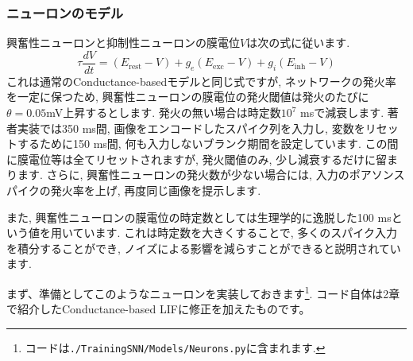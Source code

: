 \subsubsection{ニューロンのモデル}
興奮性ニューロンと抑制性ニューロンの膜電位$V$は次の式に従います. 
\begin{equation}
\tau \frac{d V}{d t}=\left(E_{\text {rest}}-V\right)+g_{e}\left(E_{\text {exc}}-V\right)+g_{i}\left(E_{\text {inh}}-V\right)    
\end{equation}
これは通常のConductance-basedモデルと同じ式ですが, ネットワークの発火率を一定に保つため, 興奮性ニューロンの膜電位の発火閾値は発火のたびに$\theta=0.05 $mV上昇するとします. 発火の無い場合は時定数$10^7$ msで減衰します. 著者実装では350 ms間, 画像をエンコードしたスパイク列を入力し, 変数をリセットするために150 ms間, 何も入力しないブランク期間を設定しています. この間に膜電位等は全てリセットされますが, 発火閾値のみ, 少し減衰するだけに留まります. さらに, 興奮性ニューロンの発火数が少ない場合には, 入力のポアソンスパイクの発火率を上げ, 再度同じ画像を提示します. \par
また, 興奮性ニューロンの膜電位の時定数としては生理学的に逸脱した100 msという値を用いています. これは時定数を大きくすることで, 多くのスパイク入力を積分することができ, ノイズによる影響を減らすことができると説明されています. \par
まず、準備としてこのようなニューロンを実装しておきます\footnote{コードは\texttt{./TrainingSNN/Models/Neurons.py}に含まれます. }. コード自体は2章で紹介したConductance-based LIFに修正を加えたものです。
